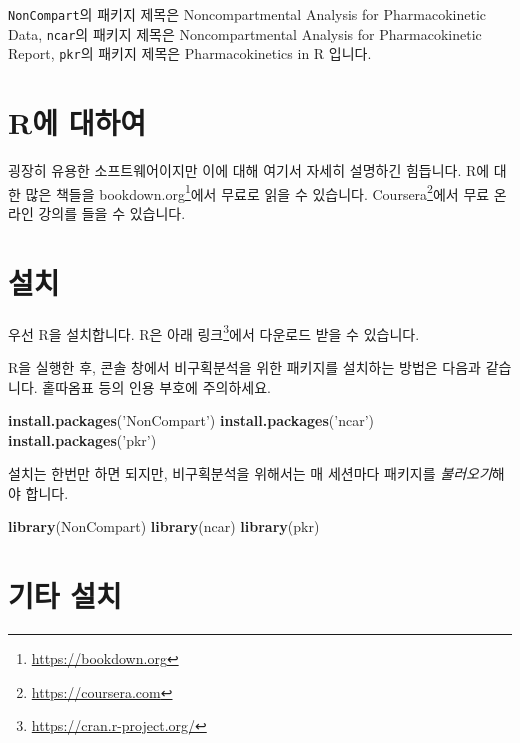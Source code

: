 \documentclass[12pt,]{krantz}
\newenvironment{Shaded}{\begin{snugshade}}{\end{snugshade}}
\newcommand{\KeywordTok}[1]{\textcolor[rgb]{0.13,0.29,0.53}{\textbf{#1}}}
\newcommand{\StringTok}[1]{\textcolor[rgb]{0.31,0.60,0.02}{#1}}
\newcommand{\NormalTok}[1]{#1}
\let\rmarkdownfootnote\footnote%
\def\footnote{\protect\rmarkdownfootnote}
\theoremstyle{definition}
\theoremstyle{definition}
\theoremstyle{definition}
\theoremstyle{remark}
\begin{document}
\texttt{NonCompart}의 패키지 제목은 Noncompartmental Analysis for
Pharmacokinetic Data, \texttt{ncar}의 패키지 제목은 Noncompartmental
Analysis for Pharmacokinetic Report, \texttt{pkr}의 패키지 제목은
Pharmacokinetics in R 입니다.

\section{R에 대하여}\label{basic}

굉장히 유용한 소프트웨어이지만 이에 대해 여기서 자세히 설명하긴
힘듭니다. R에 대한 많은 책들을 bookdown.org\footnote{\url{https://bookdown.org}}에서
무료로 읽을 수 있습니다. Coursera\footnote{\url{https://coursera.com}}에서
무료 온라인 강의를 들을 수 있습니다.

\section{설치}\label{install}

우선 R을 설치합니다. R은 아래 링크\footnote{\url{https://cran.r-project.org/}}에서
다운로드 받을 수 있습니다.

R을 실행한 후, 콘솔 창에서 비구획분석을 위한 패키지를 설치하는 방법은
다음과 같습니다. 홑따옴표 등의 인용 부호에 주의하세요.

\begin{Shaded}
\begin{Highlighting}[]
\KeywordTok{install.packages}\NormalTok{(}\StringTok{'NonCompart'}\NormalTok{)}
\KeywordTok{install.packages}\NormalTok{(}\StringTok{'ncar'}\NormalTok{)}
\KeywordTok{install.packages}\NormalTok{(}\StringTok{'pkr'}\NormalTok{)}
\end{Highlighting}
\end{Shaded}

설치는 한번만 하면 되지만, 비구획분석을 위해서는 매 세션마다 패키지를
\emph{불러오기}해야 합니다.

\begin{Shaded}
\begin{Highlighting}[]
\KeywordTok{library}\NormalTok{(NonCompart)}
\KeywordTok{library}\NormalTok{(ncar)}
\KeywordTok{library}\NormalTok{(pkr)}
\end{Highlighting}
\end{Shaded}

\section{기타 설치}\label{-}
\end{document}

